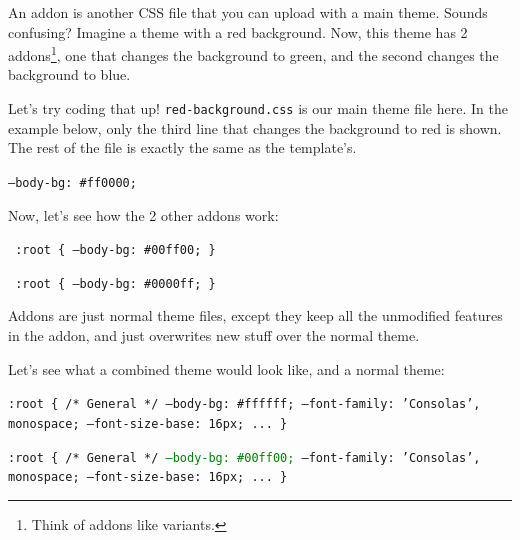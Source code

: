 \documentclass{article}
\begin{document}
An addon is another CSS file that you can upload with a main theme. Sounds confusing? Imagine a theme with a red background. Now, this theme has 2 addons\footnote{Think of addons like variants.}, one that changes the background to green, and the second changes the background to blue.

Let's try coding that up! \texttt{red-background.css} is our main theme file here. In the example below, only the third line that changes the background to red is shown. The rest of the file is exactly the same as the template's.

\begin{tcolorbox}[colback=green!5!white,colframe=green!75!black,title=red-background.css]
  \texttt{--body-bg: \#ff0000;}
\end{tcolorbox}

Now, let's see how the 2 other addons work:

\begin{tcolorbox}[colback=green!5!white,colframe=green!75!black,title=green-addon.css]
  \texttt{
  :root \{ --body-bg: \#00ff00; \}
  }
\end{tcolorbox}

\begin{tcolorbox}[colback=green!5!white,colframe=green!75!black,title=blue-addon.css]
  \texttt{
  :root \{ --body-bg: \#0000ff; \}
  }
\end{tcolorbox}

Addons are just normal theme files, except they keep all the unmodified features in the addon, and just overwrites new stuff over the normal theme.

Let's see what a combined theme would look like, and a normal theme:

\begin{tcolorbox}[colback=green!5!white,colframe=green!75!black,title=Uncombined theme]
  \texttt{:root \{ \newline
  /* General */ \newline
  --body-bg: \#ffffff; \newline
  --font-family: 'Consolas', monospace; \newline
  --font-size-base: 16px; \newline
  ... \newline \}}
\end{tcolorbox}

\begin{tcolorbox}[colback=green!5!white,colframe=green!75!black,title=Combined theme with green-addon.css]
  \texttt{:root \{ \newline
  /* General */ \newline
  \textcolor{green}{--body-bg: \#00ff00;} \newline
  --font-family: 'Consolas', monospace; \newline
  --font-size-base: 16px; \newline
  ... \newline \}}
\end{tcolorbox}
\end{document}
